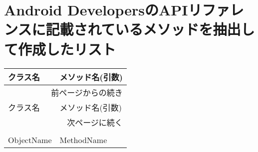 \appendix
\section{Android DevelopersのAPIリファレンスに記載されているメソッドを抽出して作成したリスト}
\label{tab:HTMLList}
\begingroup
{}
\begin{landscape}
\begin{longtable}{lp{160mm}}
  \\
  \hline
  クラス名 & メソッド名(引数) \\ \hline
  \endfirsthead
  \multicolumn{2}{r}{前ページからの続き} \\ \hline
  クラス名 & メソッド名(引数) \\ \hline
  \endhead
  \hline
  \multicolumn{2}{r}{次ページに続く} \\
  \endfoot
  \hline
  \multicolumn{2}{r}{以上} \\
  \endlastfoot
ObjectName & MethodName \\ 


\end{longtable}
\end{landscape}
